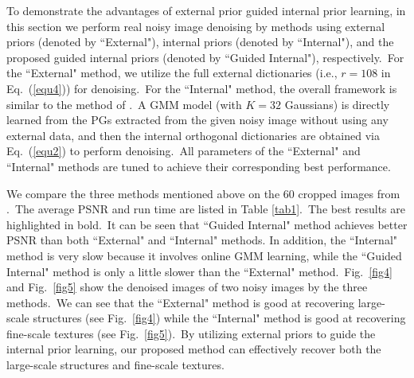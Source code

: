 \documentclass[10pt,twocolumn,letterpaper]{article}
\begin{document}
To demonstrate the advantages of external prior guided internal prior learning, in this section we perform real noisy image denoising by methods using external priors (denoted by ``External"), internal priors (denoted by ``Internal"), and the proposed guided internal priors (denoted by ``Guided Internal"), respectively.\ For the ``External" method, we utilize the full external dictionaries (i.e., $r=108$ in Eq.\ (\ref{equ4})) for denoising.\ For the ``Internal" method, the overall framework is similar to the method of \cite{ncsr}.\ A GMM model (with $K = 32$ Gaussians) is directly learned from the PGs extracted from the given noisy image without using any external data, and then the internal orthogonal dictionaries are obtained via Eq.\ (\ref{equ2}) to perform denoising.\ All parameters of the ``External" and ``Internal" methods are tuned to achieve their corresponding best performance. 

We compare the three methods mentioned above on the 60 cropped images from \cite{crosschannel2016}.\ The average PSNR and run time are listed in Table \ref{tab1}.\ The best results are highlighted in bold.\ It can be seen that ``Guided Internal" method achieves better PSNR than both ``External" and ``Internal" methods. In addition, the ``Internal" method is very slow because it involves online GMM learning, while the ``Guided Internal" method is only a little slower than the ``External" method.\ Fig.\ \ref{fig4} and Fig.\ \ref{fig5} show the denoised images of two noisy images by the three methods.\ We can see that the  ``External" method is good at recovering large-scale structures (see Fig.\ \ref{fig4}) while the ``Internal" method is good at recovering fine-scale textures (see Fig.\ \ref{fig5}).\ By utilizing external priors to guide the internal prior learning, our proposed method can effectively recover both the large-scale structures and fine-scale textures. 
\end{document}
